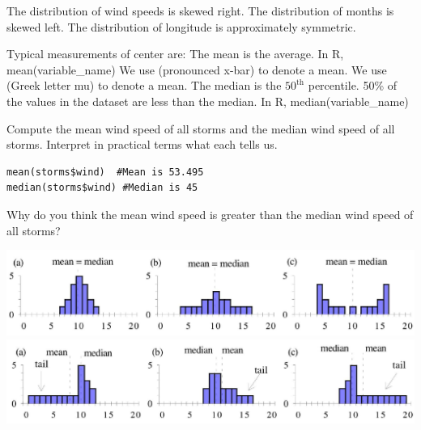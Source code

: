 \bi
\ii The distribution of wind speeds is \alert{skewed right}.
\ii The distribution of months is \alert{skewed left}.
\ii The distribution of longitude is approximately \alert{symmetric}.
\ei
\ebox



\bbox
Typical measurements of center are:
\bi
\ii The \alert{mean} is the average. In R, \alert{mean(variable\_name)}
\bi
\ii[$\circ$] We use  (pronounced x-bar) to denote a \textbf{} mean.
\ii[$\circ$] We use  (Greek letter mu) to denote a  \textbf{} mean.
\ei
\ii The \alert{median} is the $50^{\mbox{th}}$ percentile. 50\% of the values in the dataset are less than the median.  In R, \alert{median(variable\_name)}
\ei
\ebox

\bb[resume]
\ii Compute the mean wind speed of all storms and the median wind speed of all storms. Interpret in practical terms what each tells us. 

\bigskip
\begin{lstlisting}
mean(storms$wind)  #Mean is 53.495
median(storms$wind) #Median is 45
\end{lstlisting}

\vfill

\ii Why do you think the mean wind speed is greater than the median wind speed of all storms?


\vfill

\ee

\clearpage

\bbox
\begin{center}
\includegraphics[width=0.75\tw]{02/fig-symmetric.png} \\
\includegraphics[width=0.75\tw]{02/fig-skewed.png} 
\end{center}

